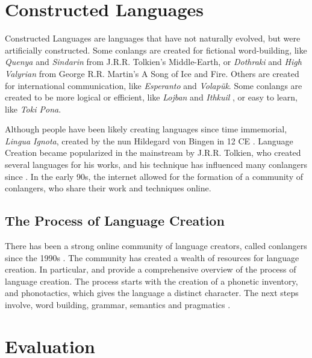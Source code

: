 \section{Constructed Languages}
Constructed Languages are languages that have not naturally evolved, but were artificially constructed. Some conlangs are created for fictional word-building,
like \textit{Quenya} and \textit{Sindarin} from J.R.R. Tolkien's Middle-Earth, or \textit{Dothraki} and \textit{High Valyrian} from George R.R. Martin's A Song of Ice and Fire.
Others are created for international communication, like \textit{Esperanto} and \textit{Volapük}. Some conlangs are created to be more logical or efficient, like \textit{Lojban} and \textit{Ithkuil}
, or easy to learn, like \textit{Toki Pona}.

Although people have been likely creating languages since time immemorial, \textit{Lingua Ignota}, created by the nun Hildegard von Bingen in 12 CE \cite{schreyerConstructedLanguages2021}.
Language Creation became popularized in the mainstream by J.R.R. Tolkien, who created several languages for his works, and his technique has influenced
many conlangers since \cite{petersonArtLanguageInvention2015}. In the early 90s, the internet allowed for the formation of a community of conlangers, 
who share their work and techniques online.

\subsection{The Process of Language Creation}

There has been a strong online community of language creators, called conlangers since the 1990s \cite{petersonArtLanguageInvention2015}. 
The community has created a wealth of resources for language creation. In particular, \cite{petersonArtLanguageInvention2015} and \cite{rosenfelder2010language} provide 
a comprehensive overview of the process of language creation. The process starts with the creation of a phonetic inventory, and phonotactics, which gives the language a distinct
character. The next steps involve, word building, grammar, semantics and pragmatics \cite{rosenfelder2010language}.


\section{Evaluation}

